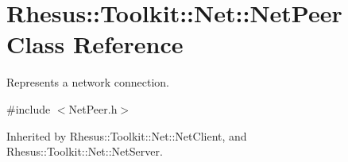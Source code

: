 \hypertarget{class_rhesus_1_1_toolkit_1_1_net_1_1_net_peer}{\section{Rhesus\-:\-:Toolkit\-:\-:Net\-:\-:Net\-Peer Class Reference}
\label{class_rhesus_1_1_toolkit_1_1_net_1_1_net_peer}
}


Represents a network connection.  




{\ttfamily \#include $<$Net\-Peer.\-h$>$}



Inherited by Rhesus\-::\-Toolkit\-::\-Net\-::\-Net\-Client, and Rhesus\-::\-Toolkit\-::\-Net\-::\-Net\-Server.

